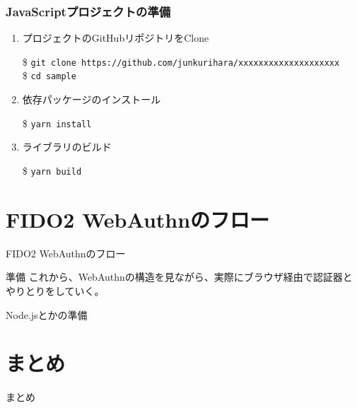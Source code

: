 \documentclass[12pt,dvipdfmx,uplatex]{beamer}
\begin{document}
\begin{frame}
\frametitle{JavaScriptプロジェクトの準備}
\begin{enumerate}
\item \alert{プロジェクトのGitHubリポジトリをClone}\\
\begin{exampleblock}{}
\footnotesize
\$ \texttt{git clone https://github.com/junkurihara/xxxxxxxxxxxxxxxxxxxx}\\
\$ \texttt{cd sample}
\end{exampleblock}
\item 依存パッケージのインストール
\begin{exampleblock}{}
\$ \texttt{yarn install}
\end{exampleblock}
\item ライブラリのビルド
\begin{exampleblock}{}
\$ \texttt{yarn build}
\end{exampleblock}
\end{enumerate}
\end{frame}


\section{FIDO2 WebAuthnのフロー}
\begin{frame}
\centering
{\Large FIDO2 WebAuthnのフロー}
\end{frame}

\begin{frame}{準備}
これから、WebAuthnの構造を見ながら、実際にブラウザ経由で認証器とやりとりをしていく。
\end{frame}

\begin{frame}
 Node.jsとかの準備
\end{frame}

\section{まとめ}
\begin{frame}
\centering
{\huge まとめ}
\end{frame}

\begin{frame}
 
\end{frame}





 

\end{document}
